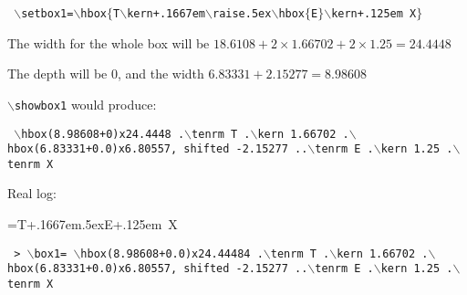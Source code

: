 {\tt
$\backslash$setbox1=$\backslash$hbox$\{$T$\backslash$kern+.1667em$\backslash$raise.5ex$\backslash$hbox$\{$E$\}$$\backslash$kern+.125em X$\}$}

The width for the whole box will be $18.6108 + 2 \times 1.66702 + 2 \times 1.25 = 24.4448$

The depth will be 0, and the width $6.83331+2.15277 = 8.98608$

{\tt $\backslash$showbox1} would produce:

{\tt \obeylines
$\backslash$hbox(8.98608+0)x24.4448
.$\backslash$tenrm T
.$\backslash$kern 1.66702
.$\backslash$hbox(6.83331+0.0)x6.80557, shifted -2.15277
..$\backslash$tenrm E
.$\backslash$kern 1.25
.$\backslash$tenrm X
}


Real log:

=\hbox{T\kern+.1667em\raise.5ex\hbox{E}\kern+.125em X}

{\tt \obeylines
> $\backslash$box1=
$\backslash$hbox(8.98608+0.0)x24.44484
.$\backslash$tenrm T
.$\backslash$kern 1.66702
.$\backslash$hbox(6.83331+0.0)x6.80557, shifted -2.15277
..$\backslash$tenrm E
.$\backslash$kern 1.25
.$\backslash$tenrm X
}

\bye
